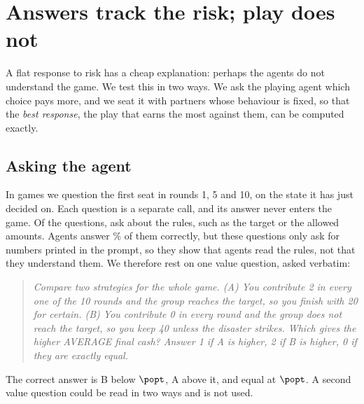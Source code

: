 \section{Answers track the risk; play does not}
\label{sec:knowing}

A flat response to risk has a cheap explanation: perhaps the agents do not understand the
game. We test this in two ways. We ask the playing agent which choice pays more, and we seat
it with partners whose behaviour is fixed, so that the \emph{best response}, the play that
earns the most against them, can be computed exactly.

\subsection{Asking the agent}

In \CntGamesProbe{} games we question the first seat in rounds 1, 5 and 10, on the state it
has just decided on. Each question is a separate call, and its answer never enters the game.
Of the \ProbeQuestions{} questions, \ProbeRuleQuestions{} ask about the rules, such as the
target or the allowed amounts. Agents answer \ProbeRulePct\% of them correctly, but these
questions only ask for numbers printed in the prompt, so they show that agents read the
rules, not that they understand them. We therefore rest on one value question, asked
verbatim:
\begin{quote}\small
\emph{Compare two strategies for the whole game. (A) You contribute 2 in every one of the 10
rounds and the group reaches the target, so you finish with 20 for certain. (B) You
contribute 0 in every round and the group does not reach the target, so you keep 40 unless
the disaster strikes. Which gives the higher AVERAGE final cash? Answer 1 if A is higher, 2
if B is higher, 0 if they are exactly equal.}
\end{quote}
The correct answer is B below $\popt$, A above it, and equal at $\popt$. A second value
question could be read in two ways and is not used.

